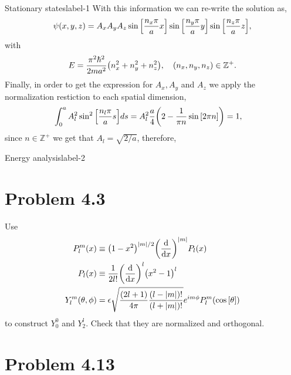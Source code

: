 \documentclass[../main.tex]{subfiles}
\begin{document}
\begin{sol}{Stationary states}{label-1}
    With this information we can re-write the solution as,
    \begin{gather*}
        \psi\qty(x,y,z)=A_x A_y A_z\sin\qty[\frac{n_x\pi}{a} x]\sin\qty[\frac{n_y\pi}{a} y]\sin\qty[\frac{n_z\pi}{a} z],
    \end{gather*} 
    with
    \begin{gather*}
        E=\frac{\pi^2\hbar^2}{2ma^2}\qty(n_x^2+n_y^2+n_z^2), \quad \qty(n_x,n_y,n_z)\in\mathbb{Z}^+.
    \end{gather*}
    Finally, in order to get the expression for $A_x,A_y$ and $A_z$ we apply the normalization restiction to each spatial dimension,
    \begin{align*}
        \int_0^a A_l^2\sin^2\qty[\frac{n_l\pi}{a} s] ds &= A^2_l\frac{a}{4}\qty(2-\frac{1}{\pi n}\sin\qty[2\pi n]) = 1,
    \end{align*}
    since $n\in\mathbb{Z}^+$ we get that $A_l=\sqrt{2/a}$, therefore,
\end{sol}


\begin{sol}{Energy analysis}{label-2}

\end{sol}


\section{Problem 4.3}

Use 
\begin{align*}
    P^m_l(x)&\equiv\qty(1-x^2)^{\abs{m}/2}\qty(\dv{x})^{\abs{m}}P_l(x) \\
    P_l\qty(x) &\equiv\frac{1}{2 l!}\qty(\dv{x})^l\qty(x^2-1)^l \\
    Y^m_l\qty(\theta,\phi) &=\epsilon\sqrt{\frac{\qty(2l+1)}{4\pi}\frac{\qty(l-\abs{m})!}{\qty(l+\abs{m})!}}e^{im\phi}P^m_l\qty(\cos\qty[\theta]) 
\end{align*}
to construct $Y^0_0$ and $Y^l_2$.
Check that they are normalized and orthogonal.

\section{Problem 4.13}
\end{document}
